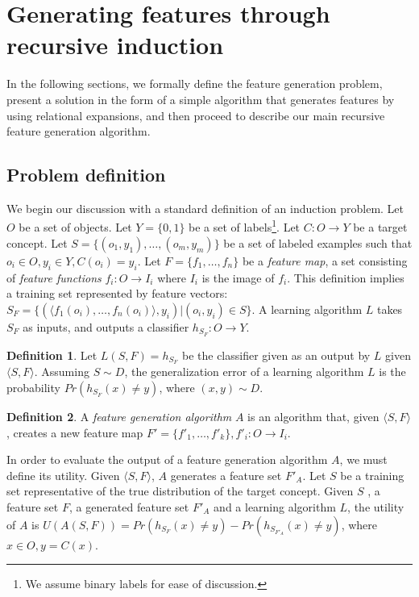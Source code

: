 \documentclass[letterpaper]{article} %
\theoremstyle{definition}
\newtheorem{defn}{Definition}
\begin{document}
\section{Generating features through recursive induction} \label{formal}

In the following sections, we formally define the feature generation problem, present a solution  in the form of a simple algorithm that generates features by using
relational expansions, and then proceed to describe our main recursive feature generation algorithm.

\subsection{Problem definition}

We begin our discussion with a standard definition of an induction problem. 
Let $O$ be a set of objects. Let $Y=\{0,1\}$ be a set of labels\footnote{We assume binary labels for ease of discussion.}. Let $C:O\rightarrow Y$ be a target concept. Let $S=\{(o_{1},y_{1}),\ldots,(o_{m},y_{m})\}$ be a set of labeled examples such that $o_{i}\in O, y_{i}\in Y, C(o_i)=y_i$. 
Let $F=\{f_{1},\ldots,f_{n}\}$ be a \emph{feature map}, a set consisting of \emph{feature functions} $f_{i}:O\rightarrow I_{i}$ where $I_{i}$ is the image of $f_i$.  This definition implies a training set represented by feature vectors: $S_F=\{ (\langle f_1(o_i),\ldots,f_n(o_i)\rangle, y_i) | (o_i,y_i) \in S\}$. A learning algorithm $L$ takes $S_F$ as inputs, and outputs a classifier $h_{S_F}:O\rightarrow Y$.
\begin{defn}
	Let $L(S,F)=h_{S_F}$ be the classifier given as an output by $L$ given $\langle S,F\rangle$. Assuming $S\sim D$, the generalization error of a learning algorithm $L$ is the probability $Pr(h_{S_F}(x)\neq y)$, where $(x,y)\sim D$.
\end{defn}

\begin{defn}
	A \emph{feature generation algorithm} $A$ is an algorithm that, given $\langle S,F\rangle$, creates a new feature map $F'=\{f'_{1},\ldots,f'_{k}\}, f'_{i}:O\rightarrow I_i$.
\end{defn}

In order to evaluate the output of a feature generation algorithm $A$, we must define its utility. Given $\langle S,F \rangle$, $A$ generates a feature set $F'_A$.
Let $S$ be a training set representative of the true distribution of the target concept.
Given $S$ , a feature set $F$, a generated feature set $F'_A$ and a learning algorithm $L$, the utility of $A$ is $U(A(S,F))=Pr(h_{S_F}(x)\neq y)-Pr(h_{S_{F'_A}}(x)\neq y)$, where $x\in O,y=C(x)$.
\end{document}
